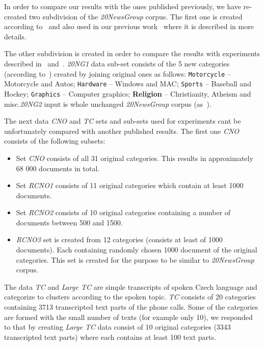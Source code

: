 \documentclass[runningheads,a4paper]{llncs}
\begin{document}
In order to compare our results with the ones published previously, we have re-created two subdivision of the \emph{20NewsGroup} corpus. The first one is created according to~\cite{refVysEval} and also used in our previous work~\cite{novotny2017unsupervised} where it is described in more details. 

The other subdivision is created in order to compare the results with experiments described in~\cite{chinniyan2017semantic} and~\cite{jiang2018text}. \emph{20NG1} data sub-set consists of the 5 new categories (according to~\cite{chinniyan2017semantic}) created by joining original ones as follows: \texttt{Motorcycle} -- Motorcycle and Autos; \texttt{Hardware} -- Windows and MAC; \texttt{Sports} -- Baseball and Hockey; \texttt{Graphics} -- Computer graphics; \textbf{Religion} -- Christianity, Atheism and misc.\emph{20NG2} input is whole unchanged \emph{20NewsGroup} corpus (as~\cite{jiang2018text}).

The next data \emph{CNO} and \emph{TC} sets and sub-sets used for experiments cant be unfortunately compared with another published results. The first one \emph{CNO} consists of the following subsets:
\begin{itemize}
\item Set \emph{CNO} consists of all 31 original categories. This results in approximately 68 000 documents in total.

\item Set \emph{RCNO1} consists of 11 original categories which contain at least 1000 documents. 

\item Set \emph{RCNO2} consists of 10 original categories containing a number of documents between 500 and 1500. 

\item \emph{RCNO3} set is created from 12 categories (consists at least of 1000 documents). Each containing randomly chosen 1000 document of the original categories. This set is created for the purpose to be similar to \emph{20NewsGroup} corpus.
\end{itemize}

The data \emph{TC} and \emph{Large TC} are simple transcripts of spoken Czech language and categorize to clusters according to the spoken topic. \emph{TC} consists of 20 categories containing 3713 transcripted text parts of the phone calls. Some of the categories are formed with the small number of texts (for example only 10), we responded to that by creating \emph{Large TC} data consist of 10 original categories (3343 transcripted text parts) where each contains at least 100 text parts.  
\end{document}

